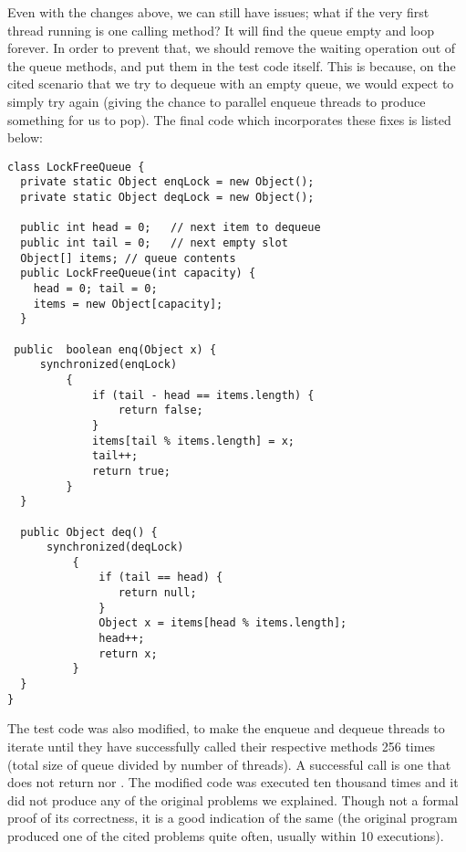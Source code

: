 Even with the changes above, we can still have issues; what if the
very first thread running is one calling  method? It will find
the queue empty and loop forever. In order to prevent that, we should
remove the waiting operation out of the queue methods, and put them in
the test code itself. This is because, on the cited scenario that we
try to dequeue with an empty queue, we would expect to simply try
again (giving the chance to parallel enqueue threads to produce something for
us to pop). The final code which incorporates these fixes is listed
below: \\

\newpage
\begin{lstlisting}[style=numbers]
class LockFreeQueue {
  private static Object enqLock = new Object();
  private static Object deqLock = new Object();
    
  public int head = 0;   // next item to dequeue
  public int tail = 0;   // next empty slot
  Object[] items; // queue contents
  public LockFreeQueue(int capacity) {
    head = 0; tail = 0;
    items = new Object[capacity];
  }

 public  boolean enq(Object x) {
     synchronized(enqLock)
         {
             if (tail - head == items.length) {
                 return false;
             }
             items[tail % items.length] = x;
             tail++;
             return true;
         }
  }

  public Object deq() {
      synchronized(deqLock)
          {
              if (tail == head) {
                 return null;
              }
              Object x = items[head % items.length];
              head++;
              return x;
          }
  }
}

\end{lstlisting}
\hfill
\newpage

The test code was also modified, to make the enqueue and dequeue
threads to iterate until they have successfully called their
respective methods 256 times (total size of queue divided by number of
threads). A successful call is one that does not return  nor
. The modified code was executed ten thousand times and it did
not produce any of the original problems we explained. Though not a
formal proof of its correctness, it is a good indication of the same
(the original program produced one of the cited problems quite often,
usually within 10 executions).


